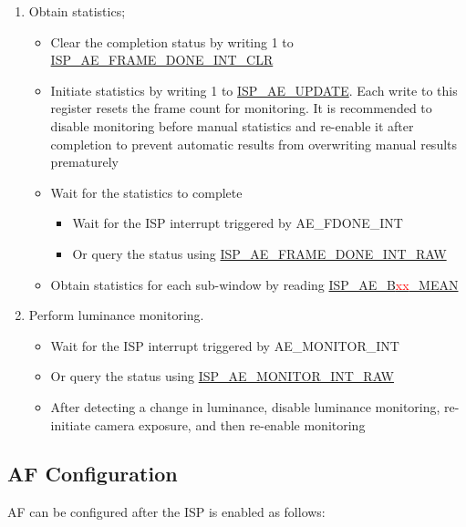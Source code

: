 \documentclass[main\_\_EN.tex]{subfiles}
\begin{document}
\begin{enumerate}
    \item Obtain statistics;
    \begin{itemize}
        \item Clear the completion status by writing 1 to \hyperref[fielddesc:ISPAEFRAMEDONEINTCLR]{ISP\_AE\_FRAME\_DONE\_INT\_CLR}
        \item Initiate statistics by writing 1 to \hyperref[fielddesc:ISPAEUPDATE]{ISP\_AE\_UPDATE}. Each write to this register resets the frame count for monitoring. It is recommended to disable monitoring before manual statistics and re-enable it after completion to prevent automatic results from overwriting manual results prematurely
        \item Wait for the statistics to complete
        \begin{itemize}
            \item Wait for the ISP interrupt triggered by AE\_FDONE\_INT
            \item Or query the status using \hyperref[fielddesc:ISPAEFRAMEDONEINTRAW]{ISP\_AE\_FRAME\_DONE\_INT\_RAW}
        \end{itemize}
        \item Obtain statistics for each sub-window by reading \hyperref[fielddesc:ISPAEB00MEAN]{ISP\_AE\_B\textcolor{red}{xx}\_MEAN}
    \end{itemize}

    \item Perform luminance monitoring.
    \begin{itemize}
        \item Wait for the ISP interrupt triggered by AE\_MONITOR\_INT
        \item Or query the status using \hyperref[fielddesc:ISPAEMONITORINTRAW]{ISP\_AE\_MONITOR\_INT\_RAW}
        \item After detecting a change in luminance, disable luminance monitoring, re-initiate camera exposure, and then re-enable monitoring
    \end{itemize}
\end{enumerate}


\subsection{AF Configuration}
AF can be configured after the ISP is enabled as follows:
\end{document}
